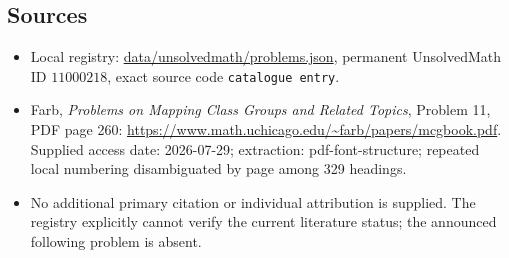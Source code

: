 \documentclass[11pt]{article}
\begin{document}
\subsection{Sources}
\begin{itemize}
\item Local registry: \url{data/unsolvedmath/problems.json}, permanent UnsolvedMath ID $11000218$, exact source code \texttt{catalogue entry}.
\item Farb, \emph{Problems on Mapping Class Groups and Related Topics}, Problem 11, PDF page 260: \url{https://www.math.uchicago.edu/~farb/papers/mcgbook.pdf}. Supplied access date: 2026-07-29; extraction: pdf-font-structure; repeated local numbering disambiguated by page among 329 headings.
\item No additional primary citation or individual attribution is supplied. The registry explicitly cannot verify the current literature status; the announced following problem is absent.
\end{itemize}
\end{document}
